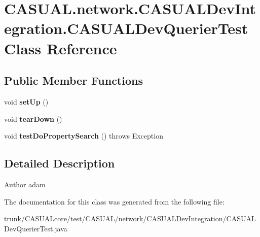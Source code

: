\hypertarget{classCASUAL_1_1network_1_1CASUALDevIntegration_1_1CASUALDevQuerierTest}{\section{C\-A\-S\-U\-A\-L.\-network.\-C\-A\-S\-U\-A\-L\-Dev\-Integration.\-C\-A\-S\-U\-A\-L\-Dev\-Querier\-Test Class Reference}
\label{classCASUAL_1_1network_1_1CASUALDevIntegration_1_1CASUALDevQuerierTest}
}
\subsection*{Public Member Functions}
\begin{DoxyCompactItemize}
\item 
\hypertarget{classCASUAL_1_1network_1_1CASUALDevIntegration_1_1CASUALDevQuerierTest_ac8e09bd2ab2c941c1080d98ee0c48c4b}{void {\bfseries set\-Up} ()}\label{classCASUAL_1_1network_1_1CASUALDevIntegration_1_1CASUALDevQuerierTest_ac8e09bd2ab2c941c1080d98ee0c48c4b}

\item 
\hypertarget{classCASUAL_1_1network_1_1CASUALDevIntegration_1_1CASUALDevQuerierTest_a6f30be752510a1b442aeef6dd77a9f8f}{void {\bfseries tear\-Down} ()}\label{classCASUAL_1_1network_1_1CASUALDevIntegration_1_1CASUALDevQuerierTest_a6f30be752510a1b442aeef6dd77a9f8f}

\item 
\hypertarget{classCASUAL_1_1network_1_1CASUALDevIntegration_1_1CASUALDevQuerierTest_a52313b3c6c7b628d081efa139e3c5d61}{void {\bfseries test\-Do\-Property\-Search} ()  throws Exception }\label{classCASUAL_1_1network_1_1CASUALDevIntegration_1_1CASUALDevQuerierTest_a52313b3c6c7b628d081efa139e3c5d61}

\end{DoxyCompactItemize}


\subsection{Detailed Description}
\begin{DoxyAuthor}{Author}
adam 
\end{DoxyAuthor}


The documentation for this class was generated from the following file\-:\begin{DoxyCompactItemize}
\item 
trunk/\-C\-A\-S\-U\-A\-Lcore/test/\-C\-A\-S\-U\-A\-L/network/\-C\-A\-S\-U\-A\-L\-Dev\-Integration/C\-A\-S\-U\-A\-L\-Dev\-Querier\-Test.\-java\end{DoxyCompactItemize}
